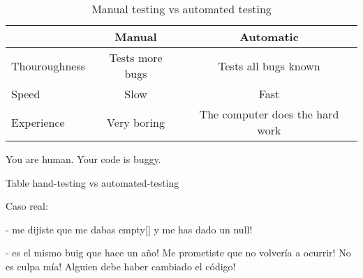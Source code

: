 \begin{table}[htbp]
  \centering
  \begin{tabular}{l|c|c}
    & Manual & Automatic \\
    \hline
    Thouroughness & Tests more bugs & Tests all bugs known \\
    Speed & Slow & Fast \\
    Experience & Very boring & The computer does the hard work \\
  \end{tabular}
  \caption{Manual testing vs automated testing}
  \label{tab:test}
\end{table}



You are human. Your code is buggy.

Table hand-testing vs automated-testing





Caso real: 

  - me dijiste que me dabas empty[] y me has dado un null!


  - es el mismo buig que hace un año! Me prometiste que no volvería a
  ocurrir!
    No es culpa mía! Alguien debe haber cambiado el código!




